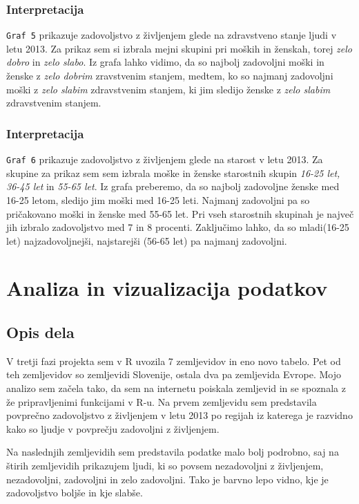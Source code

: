 \documentclass[11pt,a4paper]{article}
\begin{document}
\subsubsection{Interpretacija}
\verb+Graf 5+ prikazuje zadovoljstvo z življenjem glede na zdravstveno stanje ljudi v letu 2013. Za prikaz sem si izbrala mejni skupini pri moških in ženskah, torej \textit{zelo dobro} in \textit{zelo slabo}.  Iz grafa lahko vidimo, da so najbolj zadovoljni moški in ženske z \textit{zelo dobrim} zravstvenim stanjem, medtem, ko so najmanj zadovoljni moški z \textit{zelo slabim} zdravstvenim stanjem, ki jim sledijo ženske z \textit{zelo slabim} zdravstvenim stanjem.
\subsubsection{Interpretacija}
\verb+Graf 6+ prikazuje zadovoljstvo z življenjem glede na starost v letu 2013. Za skupine za prikaz sem sem izbrala moške in ženske starostnih skupin \textit{16-25 let, 36-45 let} in \textit{55-65 let}. Iz grafa preberemo, da so najbolj zadovoljne ženske med 16-25 letom, sledijo jim moški med 16-25 leti. Najmanj zadovoljni pa so pričakovano moški in ženske med 55-65 let. Pri vseh starostnih skupinah je največ jih izbralo zadovoljstvo med 7 in 8 procenti. Zaključimo lahko, da so mladi(16-25 let) najzadovoljnejši, najstarejši (56-65 let) pa najmanj zadovoljni.
\section{Analiza in vizualizacija podatkov}
\subsection{Opis dela}
V tretji fazi projekta sem v R uvozila 7 zemljevidov in eno novo tabelo. Pet od teh zemljevidov so zemljevidi Slovenije, ostala dva pa zemljevida Evrope. Mojo analizo sem začela tako, da sem na internetu poiskala zemljevid in se spoznala z že pripravljenimi funkcijami v R-u. Na prvem zemljevidu sem predstavila povprečno zadovoljstvo z življenjem v letu 2013 po regijah iz katerega je razvidno kako so ljudje v povprečju zadovoljni z življenjem.

Na naslednjih zemljevidih sem predstavila podatke malo bolj podrobno, saj na štirih zemljevidih prikazujem ljudi, ki so povsem nezadovoljni z življenjem, nezadovoljni, zadovoljni in zelo zadovoljni. Tako je barvno lepo vidno, kje je zadovoljstvo boljše in kje slabše.
\end{document}
